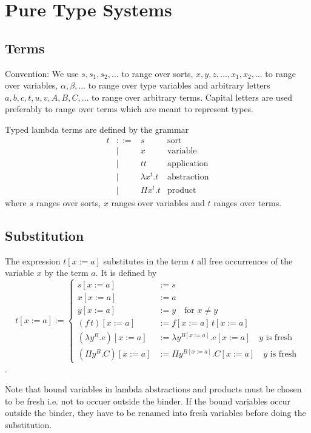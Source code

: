 \section{Pure Type Systems}

\subsection{Terms}

Convention: We use $s,s_1,s_2,\ldots$ to range over sorts,
$x,y,z,\ldots,x_1,x_2,\ldots$ to range over variables, $\alpha,\beta,\ldots$
to range over type variables and arbitrary letters $a,b,c,t,u,v,A,B,C,\ldots$
to range over arbitrary terms. Capital letters are used preferably to range
over terms which are meant to represent types.

\begin{definition}
  Typed lambda terms are defined by the grammar
  $$
  \begin{array}{llll}
    t &::=& s                 &\text{sort}
    \\
      &\mid& x                &\text{variable}
    \\
      &\mid& t t              &\text{application}
    \\
      &\mid& \lambda x^t.t    &\text{abstraction}
    \\
      &\mid& \Pi x^t.t        &\text{product}
  \end{array}
  $$
  where $s$ ranges over sorts, $x$ ranges over variables and $t$ ranges over
  terms.
\end{definition}


\subsection{Substitution}

\begin{definition}
  The expression $t[x:=a]$ substitutes in the term $t$ all free occurrences of
  the variable $x$ by the term $a$. It is defined by
  $$
  t[x:=a] :=
  \begin{cases}
    s[x:=a] &:= s
    \\
    x[x:=a] &:= a
    \\
    y[x:=a] &:= y \quad\text{for } x \ne y
    \\
    (f \, t)[x:=a] &:= f[x:=a] \, t[x:=a]
    \\
    (\lambda y^B.e)[x:=a] &:= \lambda y^{B[x:=a]}. e[x:=a]
    \quad y \text{ is fresh}
    \\
    (\Pi y^B.C)[x:=a] &:= \Pi y^{B[x:=a]}. C[x:=a]
    \quad y \text{ is fresh}
  \end{cases}
  $$.

  Note that bound variables in lambda abstractions and products must be chosen
  to be fresh i.e. not to occuer outside the binder. If the bound variables
  occur outside the binder, they have to be renamed into fresh variables
  before doing the substitution.
\end{definition}

